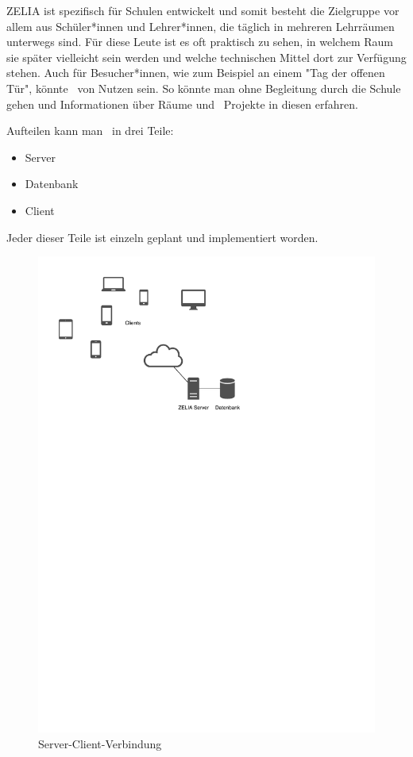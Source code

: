 ZELIA ist spezifisch für Schulen entwickelt und somit besteht die Zielgruppe vor allem aus Schüler*innen und Lehrer*innen, die täglich in mehreren Lehrräumen unterwegs sind. Für diese Leute ist es oft praktisch zu sehen, in welchem Raum sie später vielleicht sein werden und welche technischen Mittel dort zur Verfügung stehen. Auch für Besucher*innen, wie zum Beispiel an einem "Tag der offenen Tür", könnte \ZELIA\ von Nutzen sein. So könnte man ohne Begleitung durch die Schule gehen und Informationen über Räume und \zb\ Projekte in diesen erfahren.

\begin{minipage}{\textwidth}
    Aufteilen kann man \ZELIA\ in drei Teile: 
    \begin{itemize}
        \item Server
        \item Datenbank
        \item Client
    \end{itemize}
    Jeder dieser Teile ist einzeln geplant und implementiert worden.
\end{minipage}

\begin{figure}[H]
    \centering
    \includegraphics[width=120mm]{./media/Intro/client_server_arch.svg.pdf}
    \caption{Server-Client-Verbindung}
\end{figure}

